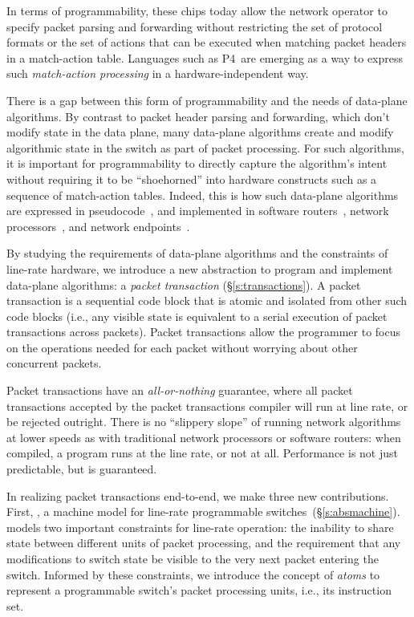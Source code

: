 In terms of programmability, these chips today allow the network operator to
specify packet parsing and forwarding without restricting the set of protocol
formats or the set of actions that can be executed when matching packet headers
in a match-action table. Languages such as P4~\cite{p4,p4spec}are emerging as a
way to express such {\em match-action processing} in a hardware-independent
way.

There is a gap between this form of programmability and the needs of data-plane
algorithms. By contrast to packet header parsing and forwarding, which don't
modify state in the data plane, many data-plane algorithms create and modify
algorithmic state in the switch as part of packet processing. For such
algorithms, it is important for programmability to directly capture the
algorithm's intent without requiring it to be ``shoehorned'' into hardware
constructs such as a sequence of match-action tables. Indeed, this is how such
data-plane algorithms are expressed in pseudocode~\cite{red, codel_code}, and
implemented in software routers~\cite{click}, network
processors~\cite{packetc}, and network endpoints~\cite{qdisc}.

By studying the requirements of data-plane algorithms and the constraints of
line-rate hardware, we introduce a new abstraction to program and implement
data-plane algorithms: a {\em packet transaction} (\S\ref{s:transactions}). A
packet transaction is a sequential code block that is atomic and isolated from
other such code blocks (i.e., any visible state is equivalent to a serial
execution of packet transactions across packets). Packet transactions allow the
programmer to focus on the operations needed for each packet without worrying
about other concurrent packets.

Packet transactions have an \textit{all-or-nothing} guarantee, where all packet
transactions accepted by the packet transactions compiler will run at line
rate, or be rejected outright. There is no ``slippery slope'' of running
network algorithms at lower speeds as with traditional network processors or
software routers: when compiled, a \pktlanguage program runs at the line rate,
or not at all.  Performance is not just predictable, but is guaranteed.

In realizing packet transactions end-to-end, we make three new contributions.
First, {\em \absmachine}, a machine model for line-rate programmable
switches~\cite{tofino, xpliant, flexpipe}(\S\ref{s:absmachine}).  \absmachine
models two important constraints for line-rate operation: the inability to
share state between different units of packet processing, and the requirement
that any modifications to switch state be visible to the very next packet
entering the switch. Informed by these constraints, we introduce the concept of
{\em atoms} to represent a programmable switch's packet processing units, i.e.,
its instruction set.

